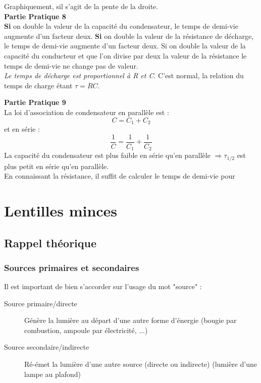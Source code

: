 \documentclass[british,french,11pt, a4paper, openany]{book}
\begin{document}
		Graphiquement, sil s'agit de la pente de la droite.\\
		
		\textbf{Partie Pratique 8}\\
		\textbf{Si} on double la valeur de la capacité du condensateur, le temps de demi-vie augmente d'un facteur deux. \textbf{Si} on double la valeur de la résistance de décharge, le temps de demi-vie augmente d'un facteur deux. Si on double la valeur de la capacité du conducteur et que l'on divise par deux la valeur de la résistance le temps de demi-vie ne change pas de valeur.\\
		\textit{Le temps de décharge est proportionnel à R et C}. C'est normal, la relation du temps de charge étant $\tau = RC$.
		
		\textbf{Partie Pratique 9}\\
		La loi d'association de condensateur en parallèle est : 
		\begin{equation}
			C = C_1 + C_2
		\end{equation}
		et en série : 
		\begin{equation}
			\frac{1}{C} = \frac{1}{C_1} + \frac{1}{C_2}
		\end{equation}
		La capacité du condensateur est plus faible en série qu'en parallèle $\Rightarrow \tau_{1/2}$ est plus petit en série qu'en parallèle.\\
		En connaissant la résistance, il suffit de calculer le temps de demi-vie pour 
		
		
		
		
		
		
		
		\newpage
		\section{Lentilles minces}
		\subsection{Rappel théorique}
		\subsubsection*{Sources primaires et secondaires}
		Il est important de bien s'accorder sur l'usage du mot "source" :
		\begin{description}
			\item[Source primaire/directe] Génère la lumière au départ d'une autre forme d'énergie (bougie par combustion, ampoule par électricité, ...)
			\item[Source secondaire/indirecte] Ré-émet la lumière d'une autre source (directe ou indirecte) (lumière d'une lampe au plafond)
		\end{description}
		
\end{document}

